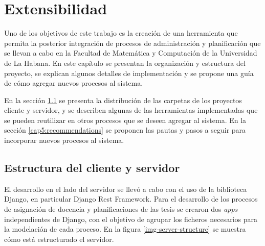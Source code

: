 \chapter{Extensibilidad}\label{chapter:extensibility}
Uno de los objetivos de este trabajo es la creación de una herramienta que 
permita la posterior integración de procesos de administración y planificación 
que se llevan a cabo en la Facultad de Matemática y Computación de la Universidad
de La Habana. 
En este capítulo
se presentan la organización y estructura del proyecto, 
se explican algunos detalles de implementación y 
se propone una guía de cómo agregar nuevos 
procesos al sistema.

En la sección \ref{cap5:structure} se presenta la distribución de las 
carpetas de los proyectos cliente y 
servidor, y se describen algunas de las herramientas implementadas que se pueden 
reutilizar en otros procesos que se deseen agregar al sistema.
En la sección \ref{cap5:recommendations} se proponen las pautas y pasos 
a seguir para incorporar nuevos procesos al sistema.

\section{Estructura del cliente y servidor}\label{cap5:structure}
El desarrollo en el lado del servidor se llevó a cabo con el  
uso de la biblioteca Django, en particular Django Rest Framework.
Para el desarrollo de los procesos de asignación de docencia y planificaciones de las 
tesis se crearon dos \textit{apps} independientes de Django, con el objetivo de agrupar los ficheros 
necesarios para la modelación de cada proceso. 
En la figura \ref{img-server-structure} se muestra cómo está estructurado el servidor.










